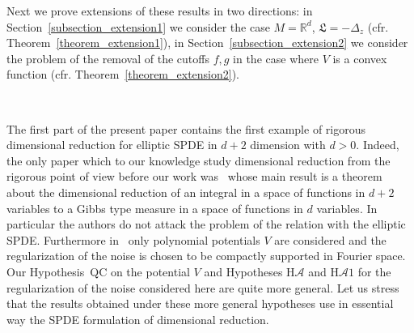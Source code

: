 \documentclass[a4paper,10pt]{article}
\begin{document}
Next we prove extensions of these results in two directions: in
Section~\ref{subsection_extension1} we consider the case $M =\mathbb{R}^d$,
$\mathfrak{L} = - \Delta_z$ (cfr. Theorem~\ref{theorem_extension1}), in
Section~\ref{subsection_extension2} we consider the problem of the removal of
the cutoffs $f, g$ in the case where $V$ is a convex function (cfr.
Theorem~\ref{theorem_extension2}).

\

The first part of the present paper contains the first example of rigorous
dimensional reduction for elliptic SPDE in $d + 2$ dimension with $d > 0$.
Indeed, the only paper which to our knowledge study dimensional reduction from
the rigorous point of view before our work was~{\cite{Klein1984}} whose main
result is a theorem about the dimensional reduction of an integral in a space
of functions in $d + 2$ variables to a Gibbs type measure in a space of
functions in $d$ variables. In particular the authors do not attack the
problem of the relation with the elliptic SPDE. Furthermore
in~{\cite{Klein1984}} only polynomial potentials $V$ are considered and the
regularization of the noise is chosen to be compactly supported in Fourier
space. Our Hypothesis~QC on the potential $V$ and Hypotheses H$\mathcal{A}$
and H$\mathcal{A} 1$ for the regularization of the noise considered here are
quite more general. Let us stress that the results obtained under these more
general hypotheses use in essential way the SPDE formulation of dimensional
reduction.

\
\end{document}
